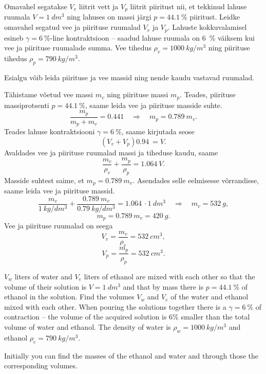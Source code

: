
Omavahel segatakse $V_v$ liitrit vett ja $V_p$ liitrit piiritust nii, et tekkinud lahuse ruumala $V=\SI{1}{dm^3}$ ning lahuses on massi järgi $p=\SI{44,1}{\percent}$ piiritust. Leidke omavahel segatud vee ja piirituse ruumalad $V_v$ ja $V_p$. Lahuste kokkuvalamisel esineb $\gamma = \SI{6}{\percent}$-line kontraktsioon -- saadud lahuse ruumala on \SI{6}{\percent} väiksem kui vee ja piirituse ruumalade summa. Vee tihedus $\rho_v=\SI{1000}{kg/m^3}$ ning piirituse tihedus $\rho_p=\SI{790}{kg/m^3}$.

\hint
Esialgu võib leida piirituse ja vee massid ning nende kaudu vastavad ruumalad.

\solu
Tähistame võetud vee massi $m_v$ ning piirituse massi $m_p$. Teades, piirituse massiprotsenti $p = \SI{44,1}{\percent}$, saame leida vee ja piirituse masside suhte.
\[ \frac{m_p}{m_p+m_v}=\SI{0,441} \quad\Rightarrow\quad m_p=\SI{0,789}{}m_v.\]
Teades lahuse kontraktsiooni $\gamma = \SI{6}{\percent}$, saame kirjutada seose
\[ (V_v + V_p)\SI{0,94}{} = V.\]
Avaldades vee ja piirituse ruumalad massi ja tiheduse kaudu, saame
\[ \frac{m_v}{\rho_v} + \frac{m_p}{\rho_p} = \SI{1,064}{}V.\]
Masside suhtest saime, et $m_p=\SI{0,789}{}m_v$. Asendades selle eelmisesse võrrandisse, saame leida vee ja piirituse massid.
\[ \frac{m_v}{\SI{1}{kg/dm^3}} + \frac{\SI{0,789}{}{m_v}}{\SI{0,79}{kg/dm^3}} = \SI{1,064}{}\cdot\SI{1}{dm^3} \quad\Rightarrow\quad
m_v = \SI{532}{g},\]
\[ m_p = \SI{0,789}{}m_v = \SI{420}{g}.\]
Vee ja piirituse ruumalad on seega
\[ V_v = \frac{m_v}{\rho_v} = \SI{532}{cm^3},\]
\[ V_p = \frac{m_p}{\rho_p} = \SI{532}{cm^3}.\]

$V_w$ liters of water and $V_e$ liters of ethanol are mixed with each other so that the volume of their solution is $V=\SI{1}{dm^3}$ and that by mass there is $p=\SI{44,1}{\percent}$ of ethanol in the solution. Find the volumes $V_w$ and $V_e$ of the water and ethanol mixed with each other. When pouring the solutions together there is a $\gamma = \SI{6}{\percent}$ of contraction – the volume of the acquired solution is 6\% smaller than the total volume of water and ethanol. The density of water is $\rho_w=\SI{1000}{kg/m^3}$ and ethanol $\rho_e=\SI{790}{kg/m^3}$.

\hinteng
Initially you can find the masses of the ethanol and water and through those the corresponding volumes.

